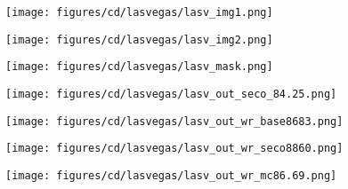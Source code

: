 \documentclass[10pt,twocolumn,letterpaper]{article}
\begin{document}
\begin{figure*}
  \centering
  
  \begin{subfigure}{0.138\linewidth}
    \centering
    \texttt{[image: figures/cd/lasvegas/lasv\_img1.png]}
\end{subfigure}
  \begin{subfigure}{0.138\linewidth}
    \centering
    \texttt{[image: figures/cd/lasvegas/lasv\_img2.png]}
  \end{subfigure}
  \begin{subfigure}{0.138\linewidth}
    \centering
    \texttt{[image: figures/cd/lasvegas/lasv\_mask.png]}
  \end{subfigure}
  \begin{subfigure}{0.138\linewidth}
    \centering
    \texttt{[image: figures/cd/lasvegas/lasv\_out\_seco\_84.25.png]}
  \end{subfigure}
  \begin{subfigure}{0.138\linewidth}
    \centering
    \texttt{[image: figures/cd/lasvegas/lasv\_out\_wr\_base8683.png]}
  \end{subfigure}
  \begin{subfigure}{0.138\linewidth}
    \centering
    \texttt{[image: figures/cd/lasvegas/lasv\_out\_wr\_seco8860.png]}
  \end{subfigure}
  \begin{subfigure}{0.138\linewidth}
    \centering
    \texttt{[image: figures/cd/lasvegas/lasv\_out\_wr\_mc86.69.png]}
  \end{subfigure}

\hspace{5mm}


\end{figure*}
\end{document}
